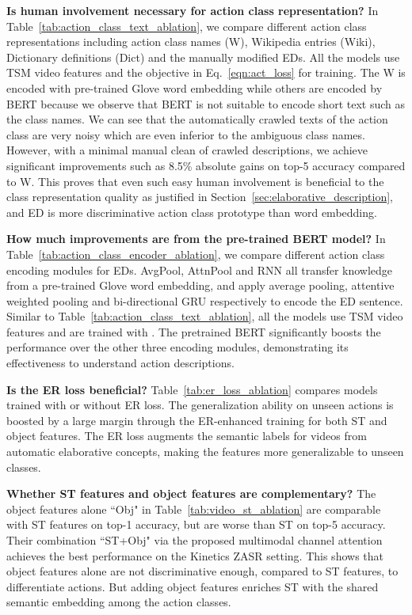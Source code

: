 \textbf{Is human involvement necessary for action class representation?}
In Table~\ref{tab:action_class_text_ablation}, we compare different action class representations including action class names (W), Wikipedia entries (Wiki), Dictionary definitions (Dict) and the manually modified EDs.
All the models use TSM video features and the  objective in Eq.~\ref{eqn:act_loss} for training. The W is encoded with pre-trained Glove word embedding while others are encoded by BERT because we observe that BERT is not suitable to encode short text such as the class names.
We can see that the automatically crawled texts of the action class are very noisy which are even inferior to the ambiguous class names.
However, with a minimal manual clean of crawled descriptions, we achieve significant improvements such as 8.5\% absolute gains on top-5 accuracy compared to W. 
This proves that even such easy human involvement is beneficial to the class representation quality as justified in Section~\ref{sec:elaborative_description}, and ED is more discriminative action class prototype than word embedding.


\textbf{How much improvements are from the pre-trained BERT model?}
In Table~\ref{tab:action_class_encoder_ablation}, we compare different action class encoding modules for EDs.
AvgPool, AttnPool and RNN all transfer knowledge from a pre-trained Glove word embedding, and apply average pooling, attentive weighted pooling and bi-directional GRU respectively to encode the ED sentence.
Similar to Table~\ref{tab:action_class_text_ablation}, all the models use TSM video features and are trained with .
The pretrained BERT significantly boosts the performance over the other three encoding modules, demonstrating its effectiveness to understand action descriptions.

\textbf{Is the ER loss beneficial?}
Table~\ref{tab:er_loss_ablation} compares models trained with or without ER loss.
The generalization ability on unseen actions is boosted by a large margin through the ER-enhanced training for both ST and object features.
The ER loss augments the semantic labels for videos from automatic elaborative concepts, making the features more generalizable to unseen classes.


\textbf{Whether ST features and object features are complementary?}
The object features alone ``Obj" in Table~\ref{tab:video_st_ablation} are comparable with ST features on top-1 accuracy, but are worse than ST on top-5 accuracy. Their combination ``ST+Obj" via the proposed multimodal channel attention achieves the best performance on the Kinetics ZASR setting.
This shows that object features alone are not discriminative enough, compared to ST features, to differentiate actions. But adding object features enriches ST with the shared semantic embedding among the action classes.

